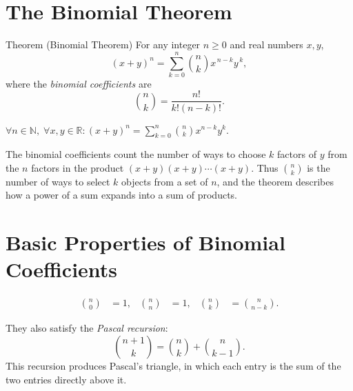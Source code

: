 
\section{The Binomial Theorem}
\label{sec:binomial-theorem}

\begin{theorembox}{Theorem (Binomial Theorem)}
For any integer \(n \ge 0\) and real numbers \(x,y\),
\[
(x+y)^n
=
\sum_{k=0}^{n} \binom{n}{k} x^{\,n-k} y^{\,k},
\]
where the \emph{binomial coefficients} are
\[
\binom{n}{k}
=
\frac{n!}{k!(n-k)!}.
\]
\end{theorembox}
\label{thm:binomial}

\begin{remark*}
\(\forall n \in \mathbb{N},\; \forall x,y \in \mathbb{R}: \displaystyle(x+y)^n = \sum_{k=0}^{n}\binom{n}{k}x^{n-k}y^{k}\).
\end{remark*}

\begin{remark*}
The binomial coefficients count the number of ways to choose \(k\) factors of
\(y\) from the \(n\) factors in the product \((x+y)(x+y)\cdots(x+y)\).
Thus \(\binom{n}{k}\) is the number of ways to select \(k\) objects from a
set of \(n\), and the theorem describes how a power of a sum expands into
a sum of products.
\end{remark*}

\section*{Basic Properties of Binomial Coefficients}

\begin{align*}
\binom{n}{0} &= 1, &
\binom{n}{n} &= 1, &
\binom{n}{k} &= \binom{n}{n-k}.
\end{align*}

They also satisfy the \emph{Pascal recursion}:
\[
\binom{n+1}{k}
=
\binom{n}{k}+\binom{n}{k-1}.
\]
This recursion produces Pascal's triangle, in which each entry is the
sum of the two entries directly above it.

\begin{center}
\end{center}

